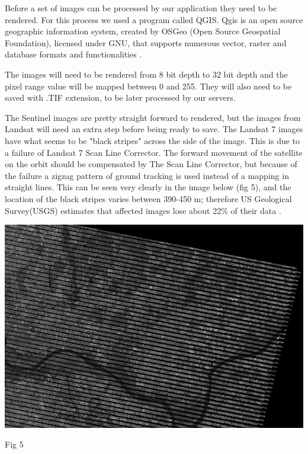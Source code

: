 \documentclass[12pt, a4paper]{report}
\begin{document}
\quad
Before a set of images can be processed by our application they need to be rendered. For this process we used a program called QGIS. Qgis is an open source geographic information system, created by OSGeo (Open Source Geospatial Foundation), licensed under GNU, that supports numerous vector, raster and database formats and functionalities \cite{QGIS}.
\par 

The images will need to be rendered from 8 bit depth to 32 bit depth and the pixel range value will be mapped between 0 and 255. They will also need to be saved with .TIF extension, to be later processed by our servers.
\par 

The Sentinel images are pretty straight forward to rendered, but the images from Landsat will need an extra step before being ready to save. The Landsat 7 images have what seems to be "black stripes" across the side of the image. This is due to a failure of Landsat 7 Scan Line Corrector. The forward movement of the satellite on the orbit should be compensated by The Scan Line Corrector, but because of the failure a zigzag pattern of ground tracking is used instead of a mapping in straight lines. This can be seen very clearly in the image below (fig 5), and the location of the black stripes varies between 390-450 m; therefore US Geological Survey(USGS) estimates that affected images lose about 22\% of their data \cite{Landsat-error}.

\bigskip

\includegraphics[scale=0.54, center]{landsat_black_stripes.png} 
\begin{center}
Fig 5
\end{center}
\par 
\end{document}

